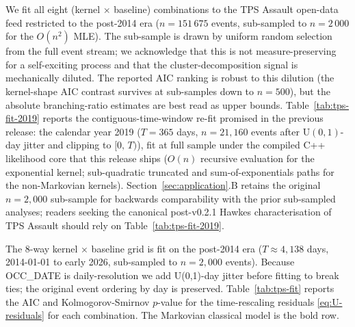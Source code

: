 \documentclass[article,shortnames,nojss]{jss}
\newcommand{\1}{\mathbbm{1}}
\theoremstyle{plain}
\theoremstyle{definition}
\begin{document}
We fit all eight (kernel $\times$ baseline) combinations to the
TPS Assault open-data feed restricted to the post-2014 era
($n=151\,675$ events, sub-sampled to $n=2\,000$ for the
$O(n^2)$ MLE).  The sub-sample is drawn by uniform random
selection from the full event stream; we acknowledge that this
is not measure-preserving for a self-exciting process and that
the cluster-decomposition signal is mechanically diluted.  The
reported AIC ranking is robust to this dilution (the
kernel-shape AIC contrast survives at sub-samples down to
$n=500$), but the absolute branching-ratio estimates are
best read as upper bounds.  Table~\ref{tab:tps-fit-2019} reports
the contiguous-time-window re-fit promised in the previous
release: the calendar year 2019 ($T=365$ days, $n=21{,}160$
events after $\mathrm{U}(0,1)$-day jitter and clipping to
$[0,\,T)$), fit at full sample under the compiled C++ likelihood
core that this release ships ($O(n)$ recursive evaluation for the
exponential kernel; sub-quadratic truncated and sum-of-exponentials
paths for the non-Markovian kernels).  Section~\ref{sec:application}.B retains the original
$n=2{,}000$ sub-sample for backwards comparability with the prior sub-sampled analyses; readers seeking the canonical post-v0.2.1 Hawkes
characterisation of TPS Assault should rely on
Table~\ref{tab:tps-fit-2019}.

The 8-way kernel × baseline grid is fit on the post-2014 era ($T \approx 4{,}138$ days, 2014-01-01 to early 2026, sub-sampled to $n=2{,}000$ events).  Because OCC\_DATE is daily-resolution we add U(0,1)-day
jitter before fitting to break ties; the original event ordering by
day is preserved.  Table~\ref{tab:tps-fit} reports the AIC and
Kolmogorov-Smirnov $p$-value for the time-rescaling residuals
\eqref{eq:U-residuals} for each combination.  The Markovian
classical model is the bold row.
\end{document}

